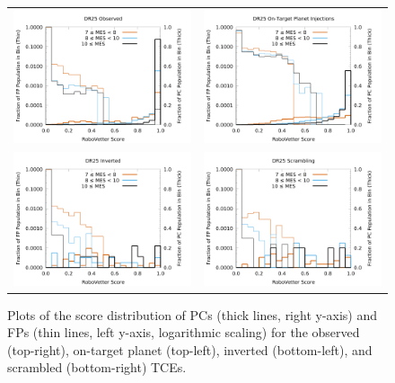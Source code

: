 \begin{figure}[h]
\centering
\begin{tabular}{cc}
\includegraphics[width=0.5\linewidth]{Scores-OBS.png} &
\includegraphics[width=0.5\linewidth]{Scores-INJ1.png} \\
\includegraphics[width=0.5\linewidth]{Scores-INV.png} &
\includegraphics[width=0.5\linewidth]{Scores-SCR1.png} \\
\end{tabular}
\caption{Plots of the score distribution of PCs (thick lines, right y-axis) and FPs (thin lines, left y-axis, logarithmic scaling) for the observed (top-right), on-target planet (top-left), inverted (bottom-left), and scrambled (bottom-right) TCEs.}
\label{score-fig-2}
\end{figure}

